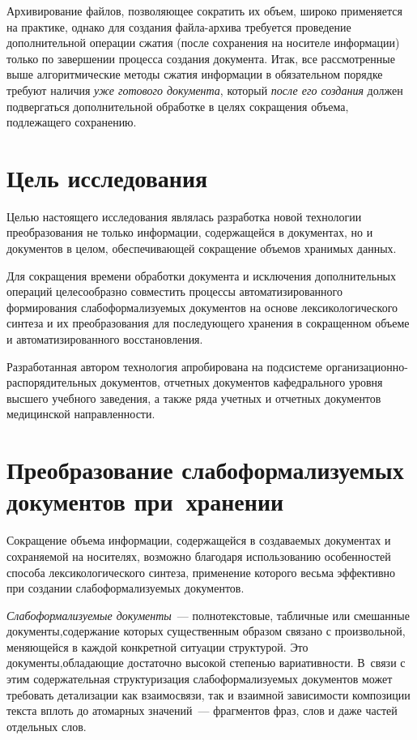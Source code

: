 \begin{multicols}{2}
     Архивирование файлов, позволяющее сократить их объем, широко 
применяется на практике, однако для создания файла-архива требуется 
проведение дополнительной операции сжатия (после сохранения на носителе 
информации) только по завершении процесса создания документа. Итак, все 
рассмотренные выше алгоритмические методы сжатия информации в 
обязательном порядке требуют наличия \textit{уже готового документа}, 
который \textit{после его создания} должен подвергаться дополнительной 
обработке в целях сокращения объема, подлежащего сохранению.

\section{Цель исследования}
     
     Целью настоящего исследования являлась разработка новой технологии 
преобразования не только информации, содержащейся в документах, но и 
документов в целом, обеспечивающей сокращение объемов хранимых данных.
     
     Для сокращения времени обработки документа и исключения 
дополнительных операций целесообразно совместить процессы 
автоматизированного формирования слабоформализуемых документов на 
основе лексикологического синтеза и их преобразования для последующего 
хранения в сокращенном объеме и автоматизированного восстановления.
     
     Разработанная автором технология апробирована на подсистеме 
организационно-рас\-по\-ря\-ди\-тель\-ных документов, отчетных документов 
кафедрального уровня высшего учебного заведения, а также ряда учетных и 
отчетных документов медицинской направленности.

\section{Преобразование слабоформализуемых документов 
при~хранении}
     
     Сокращение объема информации, содержащейся в создаваемых 
документах и сохраняемой на носителях, возможно благодаря использованию 
особенностей способа лексикологического синтеза, применение которого 
весьма эффективно при создании слабоформализуемых документов.
     
     \textit{Слабоформализуемые документы}~--- полнотекстовые, табличные 
или смешанные документы,\linebreak содержание которых существенным образом 
связано с произвольной, меняющейся в каждой конкретной ситуации 
структурой. Это документы,\linebreak об\-ла\-да\-ющие достаточно высокой степенью 
ва\-риа\-тив\-ности. В~связи с этим содержательная структуризация 
слабоформализуемых документов может требовать детализации как 
взаимосвязи, так и взаимной зависимости композиции текста вплоть до 
атомарных значений~--- фрагментов фраз, слов и даже частей отдельных слов.
     

\end{multicols}
